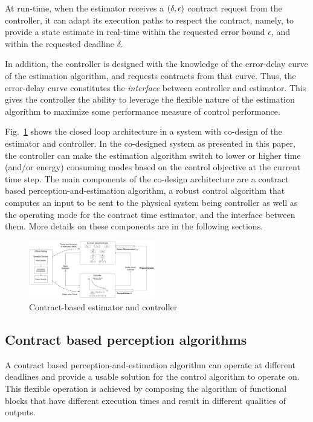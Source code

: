 At run-time, when the estimator receives a $(\delta,\epsilon)$ contract request from the controller, it can adapt its execution paths to respect the contract, namely, to provide a state estimate in real-time within the requested error bound $\epsilon$, and within the requested deadline $\delta$.

In addition, the controller is designed with the knowledge of the error-delay curve of the estimation algorithm, and requests contracts from that curve.
Thus, the error-delay curve constitutes the \textit{interface} between controller and estimator.
This gives the controller the ability to leverage the flexible nature of the estimation algorithm to maximize some performance measure of control performance. %

Fig.~\ref{fig:fullcodesignedCE} shows the closed loop architecture in a system with co-design of the estimator and controller.
In the co-designed system as presented in this paper, the controller can make the estimation algorithm switch to lower or higher time (and/or energy) consuming modes based on the control objective at the current time step.
The main components of the co-design architecture are a contract based perception-and-estimation algorithm, a robust control algorithm that computes an input to be sent to the physical system being controller as well as the operating mode for the contract time estimator, and the interface between them. More details on these components are in the following sections.

\begin{figure}[t]
	\centering
	\includegraphics[width=0.49\textwidth]{figures/omnigraffle_figures/process_figure2}
	\caption{Contract-based estimator and controller}
	\label{fig:fullcodesignedCE}
\end{figure}
\subsection{Contract based perception algorithms}

A contract based perception-and-estimation algorithm can operate at different deadlines and provide a usable solution for the control algorithm to operate on. This flexible operation is achieved by composing the algorithm of functional blocks that have different execution times and result in different qualities of outputs. 

